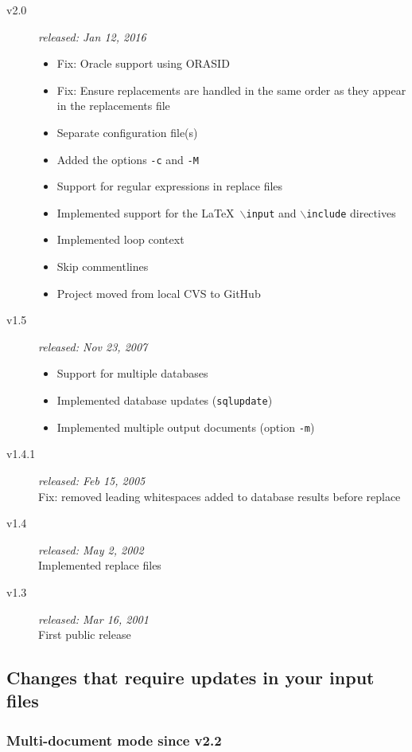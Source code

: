 \documentclass{article}
\newcommand{\bs}{\ensuremath{\backslash}}
\begin{document}
\begin{description}
\item[v2.0] \textit{released: Jan 12, 2016}
\begin{itemize}
\item Fix: Oracle support using ORASID
\item Fix: Ensure replacements are handled in the same order as they appear in the replacements file
\item Separate configuration file(s)
\item Added the options \texttt{-c} and \texttt{-M}
\item Support for regular expressions in replace files
\item Implemented support for the \LaTeX\ \texttt{\bs input} and \texttt{\bs include} directives
\item Implemented loop context
\item Skip commentlines
\item Project moved from local CVS to GitHub
\end{itemize}

\item[v1.5] \textit{released: Nov 23, 2007}
\begin{itemize}
\item Support for multiple databases
\item Implemented database updates (\texttt{sqlupdate})
\item Implemented multiple output documents (option \texttt{-m})
\end{itemize}

\item[v1.4.1] \textit{released: Feb 15, 2005}\\
Fix: removed leading whitespaces added to database results before replace

\item[v1.4] \textit{released: May 2, 2002}\\
Implemented replace files

\item[v1.3] \textit{released: Mar 16, 2001}\\
First public release

\end{description}

\subsection{Changes that require updates in your input files}

\subsubsection{Multi-document mode since v2.2}\label{mdocupdates}
\end{document}
